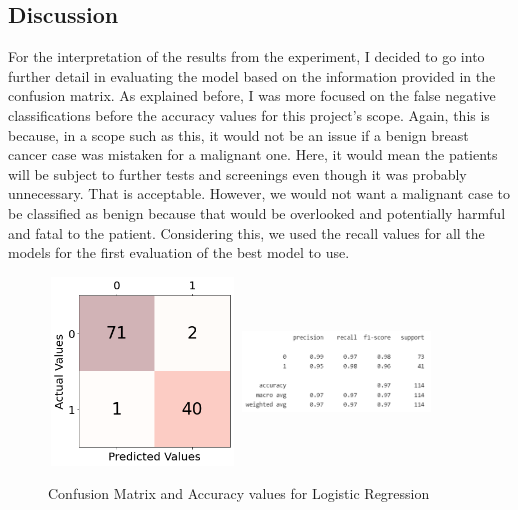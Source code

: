 \documentclass[10pt,twocolumn,letterpaper]{article}
\begin{document}
\subsection{Discussion}

For the interpretation of the results from the experiment, I decided to go into further detail in evaluating the model based on the information provided in the confusion matrix. As explained before, I was more focused on the false negative classifications before the accuracy values for this project's scope. Again, this is because, in a scope such as this, it would not be an issue if a benign breast cancer case was mistaken for a malignant one. Here, it would mean the patients will be subject to further tests and screenings even though it was probably unnecessary. That is acceptable. However, we would not want a malignant case to be classified as benign because that would be overlooked and potentially harmful and fatal to the patient. Considering this, we used the recall values for all the models for the first evaluation of the best model to use.

\begin{figure}[!ht]
    \centering
    \includegraphics[width=5cm, height=5cm, keepaspectratio]{Images/output4.png}
    \includegraphics[width=5cm, height=5cm, keepaspectratio]{Images/Picture6.png}
    \caption{Confusion Matrix and Accuracy values for Logistic Regression}
    \label{fig:my_label}
\end{figure}
\end{document}
